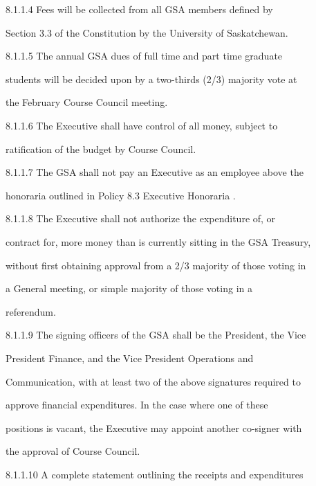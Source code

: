   8.1.1.4   Fees  will  be  collected  from  all  GSA  members  defined  by  

    Section 3.3 of the Constitution by the University of Saskatchewan.   



  8.1.1.5   The  annual  GSA  dues  of  full  time  and  part  time  graduate  

    students will be decided upon by a two-thirds (2/3) majority vote at  

    the February Course Council meeting.   



  8.1.1.6   The  Executive  shall  have  control  of  all  money,  subject  to  

    ratification of the budget by Course Council.   



  8.1.1.7   The GSA shall not pay an Executive  as an employee above the  

    honoraria outlined in Policy 8.3 Executive Honoraria .  



  8.1.1.8   The   Executive   shall   not   authorize   the   expenditure   of,   or  

    contract for, more money than is currently sitting in the GSA Treasury,  

    without first obtaining approval from a 2/3 majority of those voting in  

    a   General      meeting,      or   simple     majority     of   those     voting     in   a  

    referendum.  



  8.1.1.9   The signing officers of the GSA shall be the President, the Vice  

    President      Finance,       and     the    Vice     President       Operations       and  

    Communication, with at least two of the above signatures required to  

    approve  financial  expenditures.  In  the  case  where  one  of  these  

    positions is vacant, the Executive may appoint another co-signer with  

    the approval of Course Council.   



8.1.1.10  A  complete  statement  outlining  the  receipts  and  expenditures  

